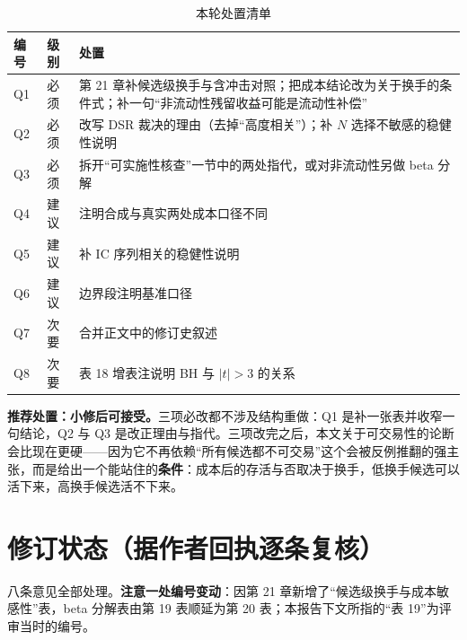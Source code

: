 \documentclass[11pt,a4paper]{ctexart}
\begin{document}
\begin{table}[htbp]
\centering
\caption{本轮处置清单}
\label{tab:actions}
\begin{tabular}{@{}>{\raggedright\arraybackslash}p{1.0cm}>{\raggedright\arraybackslash}p{1.9cm}>{\raggedright\arraybackslash}p{9.7cm}@{}}
\toprule
编号 & 级别 & 处置 \\
\midrule
Q1 & 必须 & 第 21 章补候选级换手与含冲击对照；把成本结论改为关于换手的条件式；补一句“非流动性残留收益可能是流动性补偿” \\
Q2 & 必须 & 改写 DSR 裁决的理由（去掉“高度相关”）；补 $N$ 选择不敏感的稳健性说明 \\
Q3 & 必须 & 拆开“可实施性核查”一节中的两处指代，或对非流动性另做 beta 分解 \\
Q4 & 建议 & 注明合成与真实两处成本口径不同 \\
Q5 & 建议 & 补 IC 序列相关的稳健性说明 \\
Q6 & 建议 & 边界段注明基准口径 \\
Q7 & 次要 & 合并正文中的修订史叙述 \\
Q8 & 次要 & 表 18 增表注说明 BH 与 $|t|>3$ 的关系 \\
\bottomrule
\end{tabular}
\end{table}

\textbf{推荐处置：小修后可接受。}三项必改都不涉及结构重做：Q1 是补一张表并收窄一句结论，Q2 与 Q3 是改正理由与指代。三项改完之后，本文关于可交易性的论断会比现在更硬——因为它不再依赖“所有候选都不可交易”这个会被反例推翻的强主张，而是给出一个能站住的\textbf{条件}：成本后的存活与否取决于换手，低换手候选可以活下来，高换手候选活不下来。

\section{修订状态（据作者回执逐条复核）}

八条意见全部处理。\textbf{注意一处编号变动}：因第 21 章新增了“候选级换手与成本敏感性”表，beta 分解表由第 19 表顺延为第 20 表；本报告下文所指的“表 19”为评审当时的编号。
\end{document}
